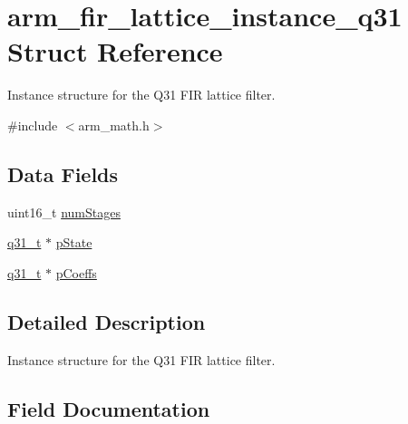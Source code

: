 \hypertarget{structarm__fir__lattice__instance__q31}{}\section{arm\+\_\+fir\+\_\+lattice\+\_\+instance\+\_\+q31 Struct Reference}
\label{structarm__fir__lattice__instance__q31}


Instance structure for the Q31 F\+IR lattice filter.  




{\ttfamily \#include $<$arm\+\_\+math.\+h$>$}

\subsection*{Data Fields}
\begin{DoxyCompactItemize}
\item 
uint16\+\_\+t \mbox{\hyperlink{structarm__fir__lattice__instance__q31_a4cceb90547b3e585d4c7aabaa8057212}{num\+Stages}}
\item 
\mbox{\hyperlink{arm__math_8h_adc89a3547f5324b7b3b95adec3806bc0}{q31\+\_\+t}} $\ast$ \mbox{\hyperlink{structarm__fir__lattice__instance__q31_adee4ba3ee8869865af7d8fa08ca913d6}{p\+State}}
\item 
\mbox{\hyperlink{arm__math_8h_adc89a3547f5324b7b3b95adec3806bc0}{q31\+\_\+t}} $\ast$ \mbox{\hyperlink{structarm__fir__lattice__instance__q31_a68888e36167d81cb7836db10367a1682}{p\+Coeffs}}
\end{DoxyCompactItemize}


\subsection{Detailed Description}
Instance structure for the Q31 F\+IR lattice filter. 

\subsection{Field Documentation}
\mbox{\label{structarm__fir__lattice__instance__q31_a4cceb90547b3e585d4c7aabaa8057212}} 
